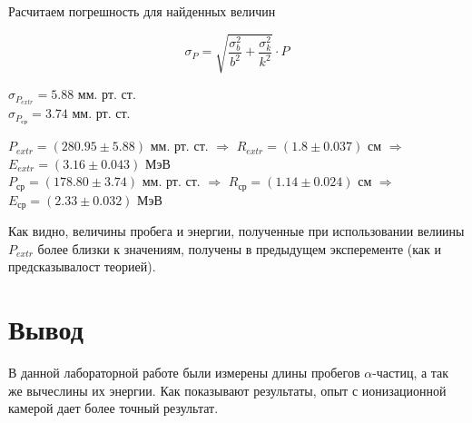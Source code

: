     Расчитаем погрешность для найденных величин

    \[ \sigma_P = \sqrt{\frac{\sigma_b^2}{b^2} + \frac{\sigma_k^2}{k^2}} \cdot P \]

    \begin{center}
        $\sigma_{P_{extr}}        = 5.88$ мм. рт. ст. \\
        $\sigma_{P_{\text{ср}}} = 3.74$ мм. рт. ст. \\
    \end{center}

    \begin{center}
        $P_{extr} = (280.95 \pm 5.88)$ мм. рт. ст. $\Rightarrow$ $R_{extr} = (1.8 \pm 0.037)$ см $\Rightarrow$ $E_{extr} = (3.16 \pm 0.043)$ МэВ\\
        $P_{\text{ср}} = (178.80 \pm 3.74)$ мм. рт. ст. $\Rightarrow$ $R_{\text{ср}} = (1.14 \pm 0.024)$ см $\Rightarrow$ $E_{\text{ср}}  = (2.33 \pm 0.032)$ МэВ
    \end{center}


    Как видно, величины пробега и энергии, полученные при использовании велиины $P_{extr}$ более близки
    к значениям, получены в предыдущем эксперементе (как и предсказывалост теорией).

    \section*{Вывод}

    В данной лабораторной работе были измерены длины пробегов $\alpha$-частиц, а так же вычеслины их энергии.
    Как показывают результаты, опыт с ионизационной камерой дает более точный результат.
